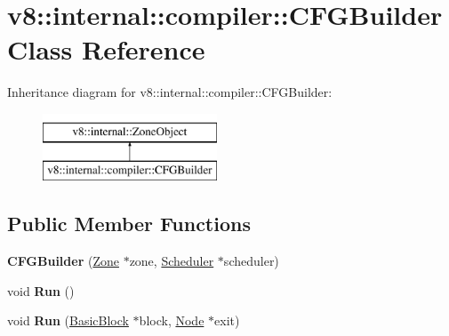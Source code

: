 \hypertarget{classv8_1_1internal_1_1compiler_1_1CFGBuilder}{}\section{v8\+:\+:internal\+:\+:compiler\+:\+:C\+F\+G\+Builder Class Reference}
\label{classv8_1_1internal_1_1compiler_1_1CFGBuilder}
Inheritance diagram for v8\+:\+:internal\+:\+:compiler\+:\+:C\+F\+G\+Builder\+:\begin{figure}[H]
\begin{center}
\leavevmode
\includegraphics[height=2.000000cm]{classv8_1_1internal_1_1compiler_1_1CFGBuilder}
\end{center}
\end{figure}
\subsection*{Public Member Functions}
\begin{DoxyCompactItemize}
\item 
\mbox{\label{classv8_1_1internal_1_1compiler_1_1CFGBuilder_a55aaa61346c562b0bc9e16d2181e7bb4}} 
{\bfseries C\+F\+G\+Builder} (\mbox{\hyperlink{classv8_1_1internal_1_1Zone}{Zone}} $\ast$zone, \mbox{\hyperlink{classv8_1_1internal_1_1compiler_1_1Scheduler}{Scheduler}} $\ast$scheduler)
\item 
\mbox{\label{classv8_1_1internal_1_1compiler_1_1CFGBuilder_a059f288038f20f74a4fea7a359584e72}} 
void {\bfseries Run} ()
\item 
\mbox{\label{classv8_1_1internal_1_1compiler_1_1CFGBuilder_a5886ce6f548528e88b24901f46ac63b3}} 
void {\bfseries Run} (\mbox{\hyperlink{classv8_1_1internal_1_1compiler_1_1BasicBlock}{Basic\+Block}} $\ast$block, \mbox{\hyperlink{classv8_1_1internal_1_1compiler_1_1Node}{Node}} $\ast$exit)
\end{DoxyCompactItemize}
